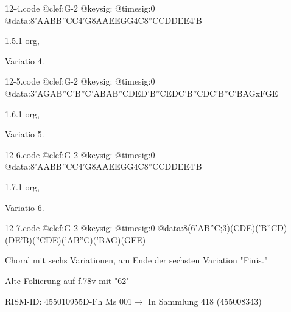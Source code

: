 \documentclass[twocolumn, 12pt]{book}
\begin{document}
\begin{filecontents*}{12-4.code}
@clef:G-2
@keysig:
@timesig:0
@data:{8'AABB}{''CC}4'G{8AAEE}{GG}4C{8''CCDD}{EE}4'B
\end{filecontents*}
\newline %
\par 1.5.1  org, \begin{itshape}Variatio 4.\end{itshape}  
\begin{filecontents*}{12-5.code}
@clef:G-2
@keysig:
@timesig:0
@data:{3'AGAB}{''C'B''C'A}{BAB''C}{DED'B}{''CEDC}{'B''CDC}{'B''C'BA}{GxFGE}
\end{filecontents*}
\newline %
\par 1.6.1  org, \begin{itshape}Variatio 5.\end{itshape}  
\begin{filecontents*}{12-6.code}
@clef:G-2
@keysig:
@timesig:0
@data:{8'AABB}{''CC}4'G{8AAEE}{GG}4C{8''CCDD}{EE}4'B
\end{filecontents*}
\newline %
\par 1.7.1  org, \begin{itshape}Variatio 6.\end{itshape}  
\begin{filecontents*}{12-7.code}
@clef:G-2
@keysig:
@timesig:0
@data:8(6{'AB''C};3)({CDE})({'B''CD})({DE'B})({''CDE})({'AB''C})({'BAG})({GFE})
\end{filecontents*}
\newline %
\par Choral mit sechs Variationen, am Ende der sechsten Variation "Finis."
\par Alte Foliierung auf f.78v mit "62"
\par RISM-ID: 455010955\newline D-Fh  Ms 001\newline $\rightarrow$ In Sammlung 418 (455008343)
      
\end{document}
